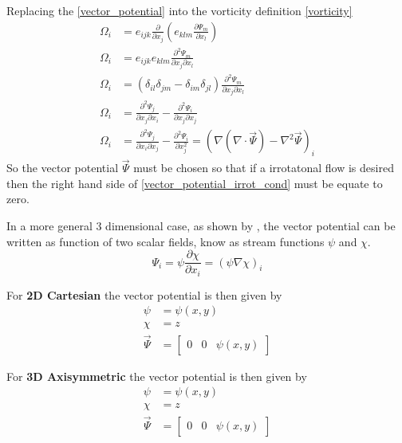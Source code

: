 Replacing the \eqref{vector_potential} into the vorticity definition \eqref{vorticity}
\begin{align}
    \Omega_i &= e_{ijk}\frac{\partial}{\partial x_j} \left(e_{klm}\frac{\partial \Psi_m}{\partial x_l}  \right)  \nonumber \\
    \Omega_i &= e_{ijk}e_{klm}\frac{\partial^2 \Psi_m}{\partial x_j \partial x_l} \nonumber \\ 
    \Omega_i &= \left( \delta_{il}\delta_{jm} - \delta_{im}\delta_{jl} \right)\frac{\partial^2 \Psi_m}{\partial x_j \partial x_l}  \nonumber\\ 
    \Omega_i &= \frac{\partial^2 \Psi_j}{\partial x_j \partial x_i} -  \frac{\partial^2 \Psi_i}{\partial x_j \partial x_j} \nonumber \\ 
    \Omega_i &= \frac{\partial^2 \Psi_j}{\partial x_i \partial x_j} -  \frac{\partial^2 \Psi_i}{\partial x_j^2} = \left(\nabla \left(\nabla \cdot \vec{\Psi} \right) - \nabla^2\vec{\Psi} \right)_i 
    \label{vector_potential_irrot_cond}
\end{align}
So the vector potential $\vec{\Psi}$ must be chosen so that if a irrotatonal flow is desired then the right hand side of \eqref{vector_potential_irrot_cond} must be equate to zero.

In a more general 3 dimensional case, as shown by \cite{} , the vector potential can be written as function of two scalar fields, know as stream functions $\psi$ and $\chi$.
\begin{equation}
    \Psi_i = \psi \frac{\partial \chi}{\partial x_i} = \left(\psi \nabla \chi \right)_i
\end{equation}


For \textbf{2D Cartesian} the vector potential is then given by
\begin{align}
    \psi &= \psi(x,y) \\
    \chi &= z \\
    \vec{\Psi} &=  \begin{bmatrix} 0 &  0 &  \psi(x,y)\end{bmatrix} 
\end{align}

For \textbf{3D Axisymmetric} the vector potential is then given by
\begin{align}
    \psi &= \psi(x,y) \\
    \chi &= z \\
    \vec{\Psi} &=  \begin{bmatrix} 0 &  0 &  \psi(x,y)\end{bmatrix} 
\end{align}



